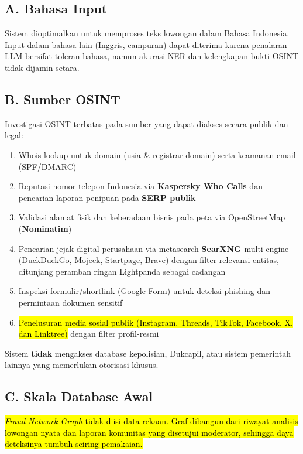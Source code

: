 \documentclass[12pt,a4paper]{article}
\newcommand{\revisi}[1]{\hl{#1}}
\begin{document}
\subsection*{A. Bahasa Input}
Sistem dioptimalkan untuk memproses teks lowongan dalam Bahasa Indonesia. Input dalam bahasa
lain (Inggris, campuran) dapat diterima karena penalaran LLM bersifat toleran
bahasa, namun akurasi NER dan kelengkapan bukti OSINT tidak dijamin setara.

\subsection*{B. Sumber OSINT}
Investigasi OSINT terbatas pada sumber yang dapat diakses secara publik dan legal:
\begin{enumerate}[label=\textbf{\arabic*.}]
  \item Whois lookup untuk domain (usia \& registrar domain) serta keamanan email (SPF/DMARC)
  \item Reputasi nomor telepon Indonesia via \textbf{Kaspersky Who Calls} dan pencarian
        laporan penipuan pada \textbf{SERP publik}
  \item Validasi alamat fisik dan keberadaan bisnis pada peta via OpenStreetMap (\textbf{Nominatim})
  \item Pencarian jejak digital perusahaan via metasearch \textbf{SearXNG} multi-engine
        (DuckDuckGo, Mojeek, Startpage, Brave) dengan filter relevansi entitas, ditunjang
        peramban ringan Lightpanda sebagai cadangan
  \item Inspeksi formulir/shortlink (Google Form) untuk deteksi phishing dan permintaan dokumen sensitif
  \item \revisi{Penelusuran media sosial publik (Instagram, Threads, TikTok, Facebook, X, dan Linktree)} dengan filter profil-resmi
\end{enumerate}
Sistem \textbf{tidak} mengakses database kepolisian, Dukcapil, atau sistem pemerintah lainnya
yang memerlukan otorisasi khusus.

\subsection*{C. Skala Database Awal}
\revisi{\textit{Fraud Network Graph} tidak diisi data rekaan. Graf dibangun dari riwayat analisis lowongan nyata dan laporan
komunitas yang disetujui moderator, sehingga daya deteksinya tumbuh seiring pemakaian.}
\end{document}
